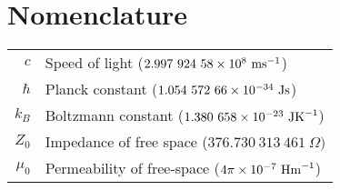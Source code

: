\chapter*{Nomenclature}
\thispagestyle{plain}

\begin{longtable}{rl}
$c$ & Speed of light ($2.997\ 924\ 58 \e{8}\ \mathrm{ms}^{-1}$) \\
$\hbar$ & Planck constant ($1.054\ 572\ 66\times 10^{-34}\ \mathrm{Js}$) \\
$k_B$ & Boltzmann constant  ($1.380\ 658\times 10^{-23}\ \mathrm{JK}^{-1} $) \\
$Z_0$ &Impedance of free space  ($376.730\ 313\ 461\ \Omega) $ \\
$\mu_0$ &Permeability of free-space ($4\pi\times 10^{-7}\ \mathrm{Hm}^{-1}$) \\
\end{longtable}
